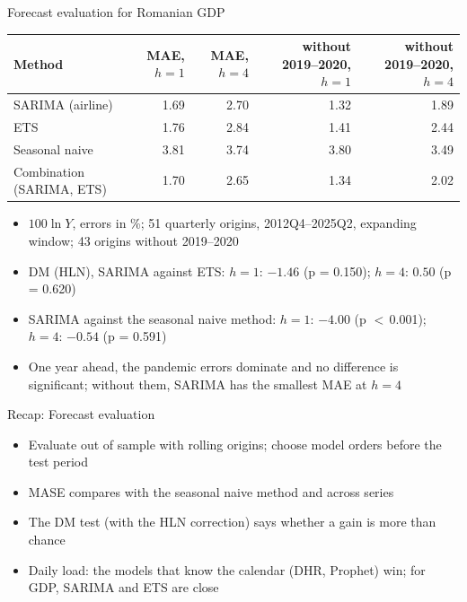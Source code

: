 \begin{frame}{Forecast evaluation for Romanian GDP}
\itemsize{\footnotesize}
\begin{center}
\scriptsize
\begin{tabular}{lrrrr}
\toprule
\textbf{Method} & MAE, $h = 1$ & MAE, $h = 4$ & without 2019--2020, $h = 1$ & without 2019--2020, $h = 4$ \\
\midrule
SARIMA (airline) & 1.69 & 2.70 & 1.32 & 1.89 \\
ETS & 1.76 & 2.84 & 1.41 & 2.44 \\
Seasonal naive & 3.81 & 3.74 & 3.80 & 3.49 \\
Combination (SARIMA, ETS) & 1.70 & 2.65 & 1.34 & 2.02 \\
\bottomrule
\end{tabular}
\end{center}
\begin{itemize}
    \item $100\ln Y$, errors in \%; 51 quarterly origins, 2012Q4--2025Q2, expanding window; 43 origins without 2019--2020
    \item DM (HLN), SARIMA against ETS: $h = 1$: $\ensuremath{-}1.46$ (p = 0.150); $h = 4$: $0.50$ (p = 0.620)
    \item SARIMA against the seasonal naive method: $h = 1$: $\ensuremath{-}4.00$ (p $<$\,0.001); $h = 4$: $\ensuremath{-}0.54$ (p = 0.591)
    \item One year ahead, the pandemic errors dominate and no difference is significant; without them, SARIMA has the smallest MAE at $h = 4$
\end{itemize}
\end{frame}

\begin{frame}{Recap: Forecast evaluation}
\itemsize{\small}
\begin{itemize}
    \item Evaluate out of sample with rolling origins; choose model orders before the test period
    \item MASE compares with the seasonal naive method and across series
    \item The DM test (with the HLN correction) says whether a gain is more than chance
    \item Daily load: the models that know the calendar (DHR, Prophet) win; for GDP, SARIMA and ETS are close
\end{itemize}
\end{frame}


